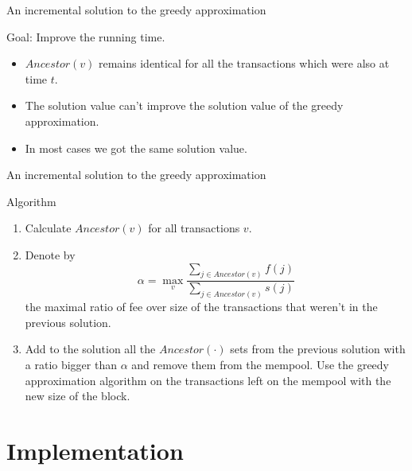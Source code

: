 \documentclass{beamer}
\begin{document}
\begin{frame}{An incremental solution to the greedy approximation} %
         \begin{block}{Goal:}
         Improve the running time.
        \end{block}
    \begin{itemize}
        \item {$Ancestor(v)$ remains 
        identical for all the transactions which were also at time $t$.}
        \item {The solution value can't improve the solution value of the greedy approximation.}
        \item {In most cases we got the same solution value.}
    \end{itemize}
\end{frame}

\begin{frame}{An incremental solution to the greedy approximation} %
    \begin{block}{Algorithm}
        \begin{enumerate}
            \item {Calculate $Ancestor(v)$ for all transactions $v$.}
            \item {Denote by $$ \alpha = \max_{v} \frac{\sum_{j\in Ancestor(v)}
             f(j)}{\sum_{j\in Ancestor(v)} s(j)} $$ the maximal ratio of fee 
             over size of the transactions that weren't in the previous 
             solution.}
            \item {Add to the solution all the $Ancestor(\cdot)$ sets from the 
            previous solution with a ratio bigger than $\alpha$ and 
            remove them from the mempool. Use the greedy approximation 
            algorithm on the transactions left on the mempool with the new size of 
            the block.}
        \end{enumerate}
    \end{block}
\end{frame}

\section {Implementation}
\end{document}
